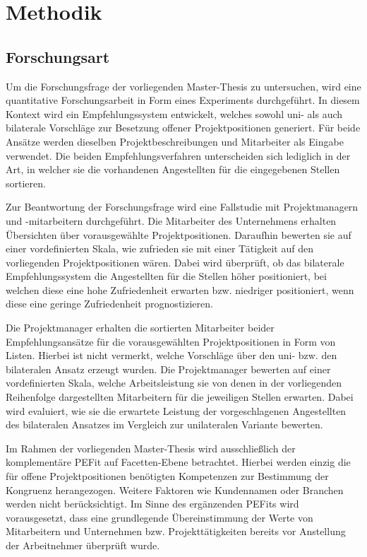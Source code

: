 \chapter{Methodik}
\label{ch:methodik}

\section{Forschungsart}
\label{ch:methodik:art}
Um die Forschungsfrage der vorliegenden Master-Thesis zu untersuchen, wird eine quantitative Forschungsarbeit in Form eines Experiments durchgeführt. In diesem Kontext wird ein Empfehlungssystem entwickelt, welches sowohl uni- als auch bilaterale Vorschläge zur Besetzung offener Projektpositionen generiert. Für beide Ansätze werden dieselben Projektbeschreibungen und Mitarbeiter als Eingabe verwendet. Die beiden Empfehlungsverfahren unterscheiden sich lediglich in der Art, in welcher sie die vorhandenen Angestellten für die eingegebenen Stellen sortieren.

Zur Beantwortung der Forschungsfrage wird eine Fallstudie mit Projektmanagern und -mitarbeitern durchgeführt. Die Mitarbeiter des Unternehmens erhalten Übersichten über vorausgewählte Projektpositionen. Daraufhin bewerten sie auf einer vordefinierten Skala, wie zufrieden sie mit einer Tätigkeit auf den vorliegenden Projektpositionen wären. Dabei wird überprüft, ob das bilaterale Empfehlungssystem die Angestellten für die Stellen höher positioniert, bei welchen diese eine hohe Zufriedenheit erwarten bzw. niedriger positioniert, wenn diese eine geringe Zufriedenheit prognostizieren.

Die Projektmanager erhalten die sortierten Mitarbeiter beider Empfehlungsansätze für die vorausgewählten Projektpositionen in Form von Listen. Hierbei ist nicht vermerkt, welche Vorschläge über den uni- bzw. den bilateralen Ansatz erzeugt wurden. Die Projektmanager bewerten auf einer vordefinierten Skala, welche Arbeitsleistung sie von denen in der vorliegenden Reihenfolge dargestellten Mitarbeitern für die jeweiligen Stellen erwarten. Dabei wird evaluiert, wie sie die erwartete Leistung der vorgeschlagenen Angestellten des bilateralen Ansatzes im Vergleich zur unilateralen Variante bewerten.

Im Rahmen der vorliegenden Master-Thesis wird ausschließlich der komplementäre \ac{PEFit} auf Facetten-Ebene betrachtet. Hierbei werden einzig die für offene Projektpositionen benötigten Kompetenzen zur Bestimmung der Kongruenz herangezogen. Weitere Faktoren wie Kundennamen oder Branchen werden nicht berücksichtigt. Im Sinne des ergänzenden \acp{PEFit} wird vorausgesetzt, dass eine grundlegende Übereinstimmung der Werte von Mitarbeitern und Unternehmen bzw. Projekttätigkeiten bereits vor Anstellung der Arbeitnehmer überprüft wurde.

